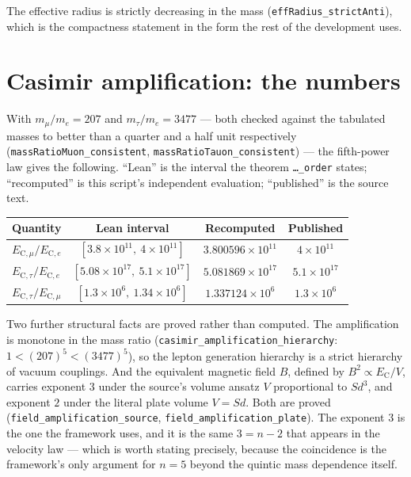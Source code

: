 \documentclass[11pt,a4paper]{article}
\begin{document}
The effective radius is strictly decreasing in the mass
(\texttt{effRadius\_strictAnti}), which is the compactness statement in the form
the rest of the development uses.


\section{Casimir amplification: the numbers}
\label{sec:casimir}

With $m_\mu/m_e = 207$ and $m_\tau/m_e = 3477$ --- both checked against the
tabulated masses to better than a quarter and a half unit respectively
(\texttt{massRatioMuon\_consistent}, \texttt{massRatioTauon\_consistent}) ---
the fifth-power law gives the following.  ``Lean'' is the interval the theorem
\texttt{\dots\_order} states; ``recomputed'' is this script's independent
evaluation; ``published'' is the source text.

\begin{center}\small
\begin{tabular}{@{}lccc@{}}
\toprule
Quantity & Lean interval & Recomputed & Published \\
\midrule
$E_{\mathrm{C},\mu}/E_{\mathrm{C},e}$ & $[3.8 \times 10^{11},\ 4 \times 10^{11}]$ & $3.800596 \times 10^{11}$ & $4\times10^{11}$ \\
$E_{\mathrm{C},\tau}/E_{\mathrm{C},e}$ & $[5.08 \times 10^{17},\ 5.1 \times 10^{17}]$ & $5.081869 \times 10^{17}$ & $5.1\times10^{17}$ \\
$E_{\mathrm{C},\tau}/E_{\mathrm{C},\mu}$ & $[1.3 \times 10^{6},\ 1.34 \times 10^{6}]$ & $1.337124 \times 10^{6}$ & $1.3\times10^{6}$ \\

\bottomrule
\end{tabular}
\end{center}

Two further structural facts are proved rather than computed.  The amplification
is monotone in the mass ratio
(\texttt{casimir\_amplification\_hierarchy}: $1 < (207)^5 < (3477)^5$), so the
lepton generation hierarchy is a strict hierarchy of vacuum couplings.  And the
equivalent magnetic field $B$, defined by $B^2 \propto E_\mathrm{C}/V$, carries
exponent $3$ under the source's volume ansatz $V$ proportional to $S d^3$, and
exponent $2$ under the literal plate volume $V = S d$.  Both are proved
(\texttt{field\_amplification\_source}, \texttt{field\_amplification\_plate}).
The exponent $3$ is the one the framework uses, and it is the same $3 = n-2$
that appears in the velocity law --- which is worth stating precisely, because
the coincidence is the framework's only argument for $n = 5$ beyond the quintic
mass dependence itself.
\end{document}
